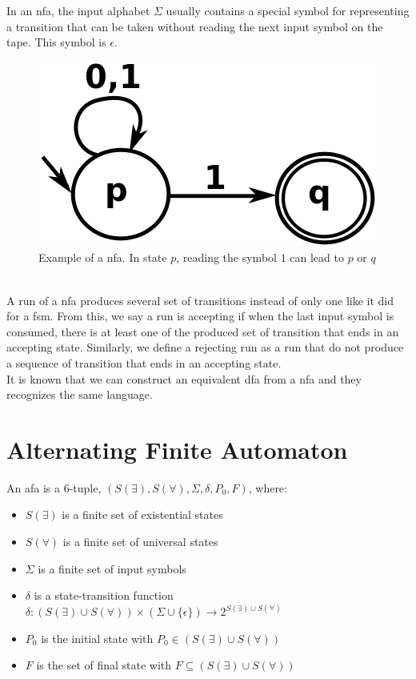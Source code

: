 \documentclass[12pt]{article}
\theoremstyle{definition}
\theoremstyle{definition}
\theoremstyle{remark}
\begin{document}
In an \gls{nfa}, the input alphabet $\Sigma$ usually contains a special symbol for representing a transition that can be taken without reading the next input symbol on the tape. This symbol is $\epsilon$.\\

\begin{figure}
    \centering
    \includegraphics[scale=0.4]{graph/nfa.png}
    \caption{Example of a \gls{nfa}. In state $p$, reading the symbol $1$ can lead to $p$ or $q$~\cite{NFA:2017}}
    \label{nfa}
\end{figure}

A run of a \gls{nfa} produces several set of transitions instead of only one like it did for a \gls{fsm}. From this, we say a run is accepting if when the last input symbol is consumed, there is at least one of the produced set of transition that ends in an accepting state. Similarly, we define a rejecting run as a run that do not produce a sequence of transition that ends in an accepting state.\\

It is known that we can construct an equivalent \gls{dfa} from a \gls{nfa} and they recognizes the same language.~\cite{10.1007/3-540-63174-7_12}



\section{Alternating Finite Automaton}


An \gls{afa} is a 6-tuple, $(S(\exists), S(\forall), \Sigma, \delta, P_0, F)$, where:

\begin{itemize}
\item $S(\exists)$ is a finite set of existential states
\item $S(\forall)$ is a finite set of universal states
\item $\Sigma$ is a finite set of input symbols
\item $\delta$ is a state-transition function $\delta: (S(\exists) \cup S(\forall)) \times (\Sigma \cup \{ \epsilon \}) \rightarrow 2^{S(\exists) \cup S(\forall)}$
\item $P_0$ is the initial state with $P_0 \in (S(\exists) \cup S(\forall))$
\item $F$ is the set of final state with $F \subseteq (S(\exists) \cup S(\forall))$
\end{itemize}
\end{document}
